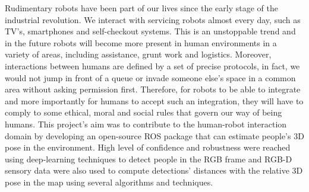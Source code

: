 Rudimentary robots have been part of our lives since the early stage of the industrial revolution. We interact with servicing robots almost every day, such as TV's, smartphones and self-checkout systems. This is an unstoppable trend and in the future robots will become more present in human environments in a variety of areas, including assistance, grunt work and logistics. Moreover, interactions between humans are defined by a set of precise protocols, in fact, we would not jump in front of a queue or invade someone else's space in a common area without asking permission first. Therefore, for robots to be able to integrate and more importantly for humans to accept such an integration, they will have to comply to some ethical, moral and social rules that govern our way of being humans. This project’s aim was to contribute to the human-robot interaction domain by developing an open-source ROS package that can estimate people’s 3D pose in the environment. High level of confidence and robustness were reached using deep-learning techniques to detect people in the RGB frame and RGB-D sensory data were also used to compute detections' distances with the relative 3D pose in the map using several algorithms and techniques.
